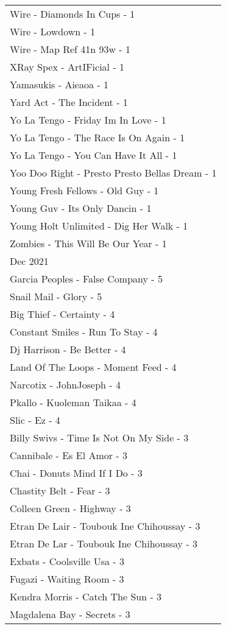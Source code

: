 \documentclass[
]{article}
\begin{document}
\begin{longtable}{l}
Wire - Diamonds In Cups - 1 \\ 
Wire - Lowdown - 1 \\ 
Wire - Map Ref 41n 93w - 1 \\ 
XRay Spex - ArtIFicial - 1 \\ 
Yamasukis - Aieaoa - 1 \\ 
Yard Act - The Incident - 1 \\ 
Yo La Tengo - Friday Im In Love - 1 \\ 
Yo La Tengo - The Race Is On Again - 1 \\ 
Yo La Tengo - You Can Have It All - 1 \\ 
Yoo Doo Right - Presto Presto Bellas Dream - 1 \\ 
Young Fresh Fellows - Old Guy - 1 \\ 
Young Guv - Its Only Dancin - 1 \\ 
Young Holt Unlimited - Dig Her Walk - 1 \\ 
Zombies - This Will Be Our Year - 1 \\ 
\midrule
\multicolumn{1}{l}{Dec 2021} \\ 
\midrule
Garcia Peoples - False Company - 5 \\ 
Snail Mail - Glory - 5 \\ 
Big Thief - Certainty - 4 \\ 
Constant Smiles - Run To Stay - 4 \\ 
Dj Harrison - Be Better - 4 \\ 
Land Of The Loops - Moment Feed - 4 \\ 
Narcotix - JohnJoseph - 4 \\ 
Pkallo - Kuoleman Taikaa - 4 \\ 
Slic - Ez - 4 \\ 
Billy Swivs - Time Is Not On My Side - 3 \\ 
Cannibale - Es El Amor - 3 \\ 
Chai - Donuts Mind If I Do - 3 \\ 
Chastity Belt - Fear - 3 \\ 
Colleen Green - Highway - 3 \\ 
Etran De Lair - Toubouk Ine Chihoussay - 3 \\ 
Etran De Lar - Toubouk Ine Chihoussay - 3 \\ 
Exbats - Coolsville Usa - 3 \\ 
Fugazi - Waiting Room - 3 \\ 
Kendra Morris - Catch The Sun - 3 \\ 
Magdalena Bay - Secrets - 3 \\ 

\end{longtable}
\end{document}
